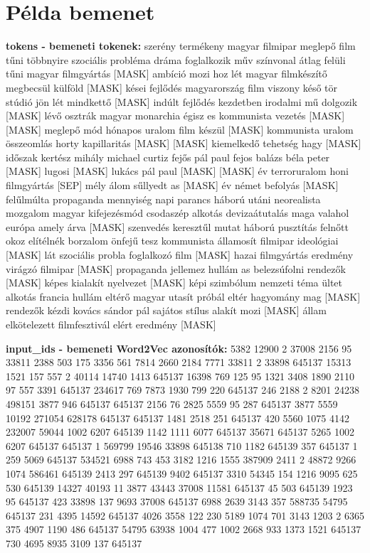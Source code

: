 \chapter{Példa bemenet}
\label{appx:input}

\textbf{tokens - bemeneti tokenek:}
szerény termékeny magyar filmipar meglepő film tűni többnyire szociális probléma dráma foglalkozik műv színvonal átlag felüli tűni magyar filmgyártás [MASK] ambíció mozi hoz lét magyar filmkészítő megbecsül külföld [MASK] kései fejlődés magyarország film viszony késő tör stúdió jön lét mindkettő [MASK] indúlt fejlődés kezdetben irodalmi mű dolgozik [MASK] lévő osztrák magyar monarchia égisz es kommunista vezetés [MASK] [MASK] meglepő mód hónapos uralom film készül [MASK] kommunista uralom összeomlás horty kapillaritás [MASK] [MASK] kiemelkedő tehetség hagy [MASK] időszak kertész mihály michael curtiz fejős pál paul fejos balázs béla peter [MASK] lugosi [MASK] lukács pál paul [MASK] [MASK] év terroruralom honi filmgyártás [SEP] mély álom sűllyedt as [MASK] év német befolyás [MASK] felűlmúlta propaganda mennyiség napi parancs háború utáni neorealista mozgalom magyar kifejezésmód csodaszép alkotás devizaátutalás maga valahol európa amely árva [MASK] szenvedés keresztűl mutat háború pusztítás felnőtt okoz elítélnék borzalom önfejű tesz kommunista államosít filmipar ideológiai [MASK] lát szociális probla foglalkozó film [MASK] hazai filmgyártás eredmény virágzó filmipar [MASK] propaganda jellemez hullám as belezsúfolni rendezők [MASK] képes kialakít nyelvezet [MASK] képi szimbólum nemzeti téma ültet alkotás francia hullám eltérő magyar utasít próbál eltér hagyomány mag [MASK] rendezők kézdi kovács sándor pál sajátos stílus alakít mozi [MASK] állam elkötelezett filmfesztivál elért eredmény [MASK]

\textbf{input\_ids - bemeneti Word2Vec azonosítók:}
5382 12900 2 37008 2156 95 33811 2388 503 175 3356 561 7814 2660 2184 7771 33811 2 33898 645137 15313 1521 157 557 2 40114 14740 1413 645137 16398 769 125 95 1321 3408 1890 2110 97 557 3391 645137 234617 769 7873 1930 799 220 645137 246 2188 2 8201 24238 498151 3877 946 645137 645137 2156 76 2825 5559 95 287 645137 3877 5559 10192 271054 628178 645137 645137 1481 2518 251 645137 420 5560 1075 4142 232007 59044 1002 6207 645139 1142 1111 6077 645137 35671 645137 5265 1002 6207 645137 645137 1 569799 19546 33898 645138 710 1182 645139 357 645137 1 259 5069 645137 534521 6988 743 453 3182 1216 1555 387909 2411 2 48872 9266 1074 586461 645139 2413 297 645139 9402 645137 3310 54345 154 1216 9095 625 530 645139 14327 40193 11 3877 43443 37008 11581 645137 45 503 645139 1923 95 645137 423 33898 137 9693 37008 645137 6988 2639 3143 357 588735 54795 645137 231 4395 14592 645137 4026 3558 122 230 5189 1074 701 3143 1203 2 6365 375 4907 1190 486 645137 54795 63938 1004 477 1002 2668 933 1373 1521 645137 730 4695 8935 3109 137 645137

